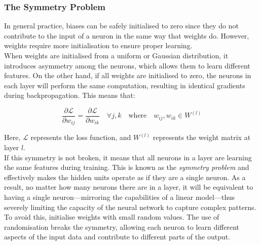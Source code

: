 \subsubsection*{The Symmetry Problem}
In general practice, biases can be safely initialised to zero since they do not contribute to the input of a neuron in the same way that weights do. However, weights require more initialisation to ensure proper learning.\\

When weights are initialised from a uniform or Gaussian distribution, it introduces asymmetry among the neurons, which allows them to learn different features. On the other hand, if all weights are initialised to zero, the neurons in each layer will perform the same computation, resulting in identical gradients during backpropagation. This means that:

\begin{equation}
    \frac{\partial \mathcal{L}}{\partial w_{ij}} = \frac{\partial \mathcal{L}}{\partial w_{ik}} \quad \forall j, k \quad \text{where} \quad w_{ij}, w_{ik} \in W^{(l)}
\end{equation}

Here, \(\mathcal{L}\) represents the loss function, and \(W^{(l)}\) represents the weight matrix at layer \(l\).\\

If this symmetry is not broken, it means that all neurons in a layer are learning the same features during training. This is known as the \emph{symmetry problem} and effectively makes the hidden units operate as if they are a single neuron. As a result, no matter how many neurons there are in a layer, it will be equivalent to having a single neuron—mirroring the capabilities of a linear model—thus severely limiting the capacity of the neural network to capture complex patterns.\\

To avoid this, initialise weights with small random values. The use of randomisation breaks the symmetry, allowing each neuron to learn different aspects of the input data and contribute to different parts of the output.

